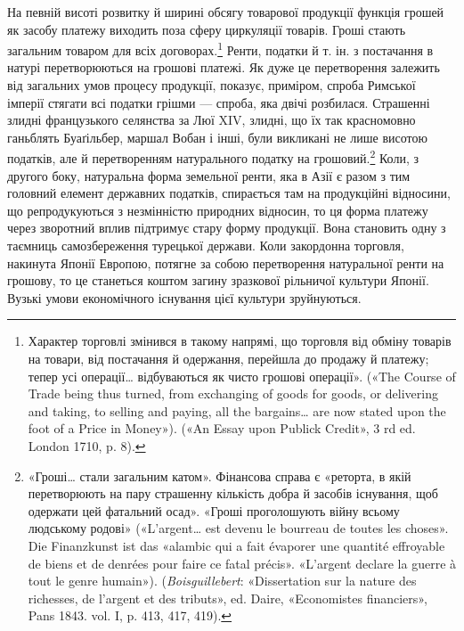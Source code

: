 На певній висоті розвитку й ширині обсягу товарової продукції функція грошей як засобу платежу
виходить поза сферу циркуляції товарів. Гроші стають загальним товаром для всіх
договорах.\footnote{
Характер торговлі змінився в такому напрямі, що торговля від
обміну товарів на товари, від постачання й одержання, перейшла до продажу
й платежу; тепер усі операції\dots{} відбуваються як чисто грошові
операції». («The Course of Trade being thus turned, from exchanging of
goods for goods, or delivering and taking, to selling and paying, all the
bargains\dots{} are now stated upon the foot of a Price in Money»). («An Essay
upon Publick Credit», 3 rd ed. London 1710, p. 8).
} Ренти, податки й т. ін. з постачання в натурі перетворюються
на грошові платежі. Як дуже це перетворення
залежить від загальних умов процесу продукції, показує, приміром,
спроба Римської імперії стягати всі податки грішми —
спроба, яка двічі розбилася. Страшенні злидні французького
селянства за Люї XIV, злидні, що їх так красномовно ганьблять
Буаґільбер, маршал Вобан і інші, були викликані не лише висотою
податків, але й перетворенням натурального податку на
грошовий.\footnote{
«Гроші\dots{} стали загальним катом». Фінансова справа є «реторта, в
якій перетворюють на пару страшенну кількість добра й засобів існування,
щоб одержати цей фатальний осад». «Гроші проголошують війну всьому
людському родові» («L’argent\dots{} est devenu le bourreau de toutes les choses».
Die Finanzkunst ist das «alambic qui a fait évaporer une quantité
effroyable de biens et de denrées pour faire ce fatal précis». «L’argent declare
la guerre à tout le genre humain»). (\emph{Boisguillebert}: «Dissertation sur la
nature des richesses, de l’argent et des tributs», ed. Daire, «Economistes
financiers», Pans 1843. vol. I, p. 413, 417, 419).
} Коли, з другого боку, натуральна форма земельної
ренти, яка в Азії є разом з тим головний елемент державних
податків, спирається там на продукційні відносини, що репродукуються
з незмінністю природних відносин, то ця форма платежу
через зворотний вплив підтримує стару форму продукції. Вона
становить одну з таємниць самозбереження турецької держави.
Коли закордонна торговля, накинута Японії Европою, потягне
за собою перетворення натуральної ренти на грошову, то це
станеться коштом загину зразкової рільничої культури Японії.
Вузькі умови економічного існування цієї культури зруйнуються.

